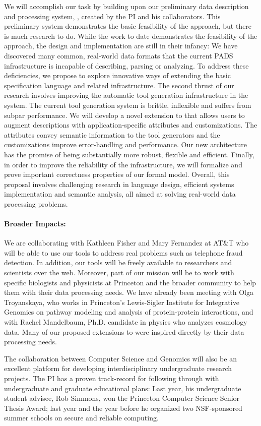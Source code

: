 We will accomplish our task by building upon our preliminary data
description and processing system, \pads{}, created by the PI and his
collaborators.  This preliminary system demonstrates the basic
feasibility of the \pads{} approach, but there is much research to do.
While the work to date demonstrates the feasibility of the \pads{}
approach, the \pads{} design and implementation are still in their
infancy: We have discovered many common, real-world data formats that
the current PADS infrastructure is incapable of describing, parsing or
analyzing.  To address these deficiencies, we propose to explore
innovative ways of extending the basic \pads{} specification language
and related infrastructure.  The second thrust of our research
involves improving the automatic tool generation infrastructure in the
\pads{} system.  The current tool generation system is brittle,
inflexible and suffers from subpar performance.  We will develop a
novel extension to \pads{} that allows users to augment \pads{}
descriptions with application-specific attributes and customizations.
The attributes convey semantic information to the tool generators and
the customizations improve error-handling and performance.  Our new
architecture has the promise of being substantially more robust,
flexible and efficient.  Finally, in order to improve the reliability
of the infrastructure, we will formalize \pads{} and prove important
correctness properties of our formal model.  Overall, this proposal
involves challenging research in language design, efficient systems
implementation and semantic analysis, all aimed at solving real-world
data processing problems.

\paragraph*{Broader Impacts:}  We are collaborating with Kathleen Fisher
and Mary Fernandez at
AT\&T who will be able to use our tools to address real problems such
as telephone fraud detection.  In addition, our tools will be freely
available to researchers and scientists over the web.  Moreover, part
of our mission will be to work with specific biologists and
physicists at Princeton and the broader community to help them with
their data processing needs.  We have already been meeting with Olga
Troyanskaya, who works in Princeton's Lewis-Sigler Institute for
Integrative Genomics on pathway modeling and analysis of
protein-protein interactions, and with Rachel Mandelbaum, Ph.D. candidate
in physics who analyzes cosmology data.  Many of our proposed extensions to
\pads{} were inspired directly by their data processing needs.  

The collaboration between Computer Science and Genomics will also be an
excellent platform for developing interdisciplinary undergraduate
research projects.  The PI has a proven track-record 
for following through with undergraduate and graduate
educational plans:  Last year, his undergraduate student advisee, Rob Simmons,
won the Princeton Computer Science Senior Thesis Award;
last year and the year before he organized two NSF-sponsored summer schools
on secure and reliable computing.

